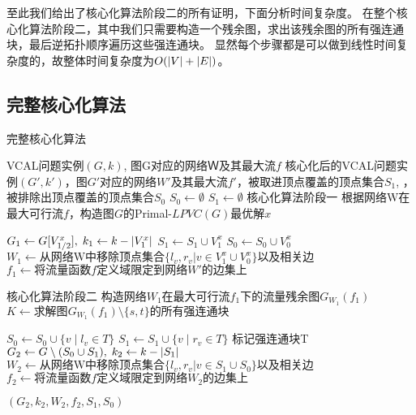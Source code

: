 至此我们给出了核心化算法阶段二的所有证明，下面分析时间复杂度。
在整个核心化算法阶段二，其中我们只需要构造一个残余图，求出该残余图的所有强连通块，最后逆拓扑顺序遍历这些强连通块。
显然每个步骤都是可以做到线性时间复杂度的，故整体时间复杂度为$O(\left\vert V \right\vert + \left\vert E \right\vert)$。

\subsection{完整核心化算法}

\begin{algorithm}
\caption{完整核心化算法}
\begin{algorithmic}[1]
\Require VCAL问题实例$(G,k)$, 图G对应的网络Ｗ及其最大流$f$
\Ensure  核心化后的VCAL问题实例$(G',k')$，图$G'$对应的网络$W'$及其最大流$f'$，被取进顶点覆盖的顶点集合$S_1$,
        ，被排除出顶点覆盖的顶点集合$S_0$
\algrule
{}
    \State $S_0 \gets \emptyset$
    \State $S_1 \gets \emptyset$
    \State \Comment 核心化算法阶段一
    \State 根据网络W在最大可行流$f$，构造图$G$的Primal-$LPVC(G)$最优解$x$

    \State $G_1 \gets G[V^x_{1/2}],\;k_1 \gets k - \left\vert V^x_1 \right\vert$
    \State $S_1 \gets S_1 \cup V^x_1$
    \State $S_0 \gets S_0 \cup V^x_0$
    \State $W_1 \gets \text{从网络W中移除顶点集合}\{l_v, r_v | v \in V^x_1 \cup V^x_0\}\text{以及相关边}$
    \State $f_1 \gets \text{将流量函数$f$定义域限定到网络$W'$的边集上}$

    \State \Comment 核心化算法阶段二
    \State 构造网络$W_1$在最大可行流$f_1$下的流量残余图$G_{W_1}(f_1)$
    \State $K \gets \text{求解图$G_{W_1}(f_1) \setminus \{s, t\}$的所有强连通块}$

            \State $S_0 \gets S_0 \cup \{v\;|\;l_v \in T\}$
            \State $S_1 \gets S_1 \cup \{v\;|\;r_v \in T\}$
            \State 标记强连通块T
        \EndIf
    \EndFor
    \State $G_2 \gets G \setminus (S_0 \cup S_1),\;k_2 \gets k - \left\vert S_1 \right\vert$
    \State $W_2 \gets \text{从网络W中移除顶点集合}\{l_v, r_v | v \in S_1 \cup S_0\}\text{以及相关边}$
    \State $f_2 \gets \text{将流量函数$f$定义域限定到网络$W_2$的边集上}$

    \State \Return $(G_2, k_2, W_2, f_2, S_1, S_0)$
\EndFunction
\end{algorithmic}
\end{algorithm} 